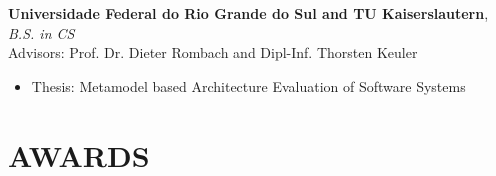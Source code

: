 \documentclass[centered,overlapped]{res}
\begin{document}
\begin{resume}
  \textbf{Universidade Federal do Rio Grande do Sul and TU Kaiserslautern}, {\sl B.S. in CS} \\ %
  Advisors: Prof. Dr. Dieter Rombach and Dipl-Inf. Thorsten Keuler
  \begin{itemize}  \itemsep -2pt
  \item Thesis: Metamodel based Architecture Evaluation of Software Systems
  \end{itemize}


%

\section{AWARDS}


\end{resume}
\end{document}
